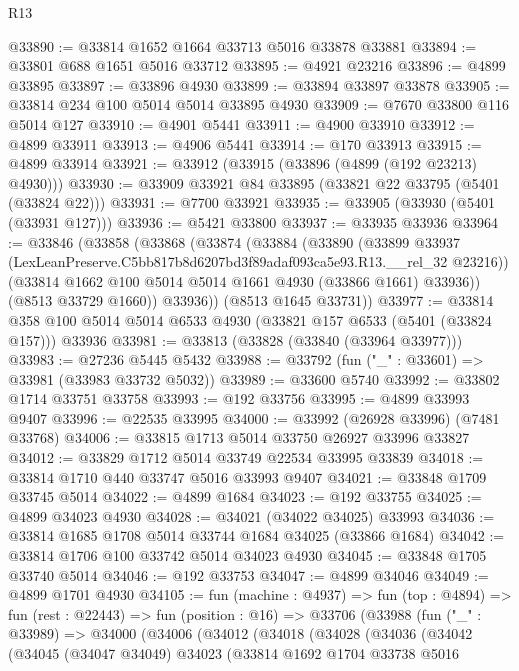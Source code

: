 \begin{lexlean}{R13}
\begin{coremodule}
@33890 := @33814 @1652 @1664 @33713 @5016 @33878 @33881
@33894 := @33801 @688 @1651 @5016 @33712
@33895 := @4921 @23216
@33896 := @4899 @33895
@33897 := @33896 @4930
@33899 := @33894 @33897 @33878
@33905 := @33814 @234 @100 @5014 @5014 @33895 @4930
@33909 := @7670 @33800 @116 @5014 @127
@33910 := @4901 @5441
@33911 := @4900 @33910
@33912 := @4899 @33911
@33913 := @4906 @5441
@33914 := @170 @33913
@33915 := @4899 @33914
@33921 := @33912 (@33915 (@33896 (@4899 (@192 @23213) @4930)))
@33930 := @33909 @33921 @84 @33895 (@33821 @22 @33795 (@5401 (@33824 @22)))
@33931 := @7700 @33921
@33935 := @33905 (@33930 (@5401 (@33931 @127)))
@33936 := @5421 @33800
@33937 := @33935 @33936
@33964 := @33846
    (@33858
      (@33868
        (@33874
          (@33884
            (@33890
              (@33899
                @33937
                (LexLeanPreserve.C5bb817b8d6207bd3f89adaf093ca5e93.R13.__rel_32 @23216))
              (@33814 @1662 @100 @5014 @5014 @1661 @4930 (@33866 @1661) @33936))
            (@8513 @33729 @1660))
          @33936))
      (@8513 @1645 @33731))
@33977 := @33814 @358 @100 @5014 @5014 @6533 @4930 (@33821 @157 @6533 (@5401 (@33824 @157))) @33936
@33981 := @33813 (@33828 (@33840 (@33964 @33977)))
@33983 := @27236 @5445 @5432
@33988 := @33792 (fun ("_" : @33601) => @33981 (@33983 @33732 @5032))
@33989 := @33600 @5740
@33992 := @33802 @1714 @33751 @33758
@33993 := @192 @33756
@33995 := @4899 @33993 @9407
@33996 := @22535 @33995
@34000 := @33992 (@26928 @33996) (@7481 @33768)
@34006 := @33815 @1713 @5014 @33750 @26927 @33996 @33827
@34012 := @33829 @1712 @5014 @33749 @22534 @33995 @33839
@34018 := @33814 @1710 @440 @33747 @5016 @33993 @9407
@34021 := @33848 @1709 @33745 @5014
@34022 := @4899 @1684
@34023 := @192 @33755
@34025 := @4899 @34023 @4930
@34028 := @34021 (@34022 @34025) @33993
@34036 := @33814 @1685 @1708 @5014 @33744 @1684 @34025 (@33866 @1684)
@34042 := @33814 @1706 @100 @33742 @5014 @34023 @4930
@34045 := @33848 @1705 @33740 @5014
@34046 := @192 @33753
@34047 := @4899 @34046
@34049 := @4899 @1701 @4930
@34105 := fun (machine : @4937) =>
  fun (top : @4894) =>
  fun (rest : @22443) =>
  fun (position : @16) =>
  @33706
    (@33988
      (fun ("_" : @33989) =>
      @34000
        (@34006
          (@34012
            (@34018
              (@34028
                (@34036
                  (@34042
                    (@34045
                      (@34047 @34049)
                      @34023
                      (@33814
                        @1692
                        @1704
                        @33738
                        @5016

\end{coremodule}
\end{lexlean}
